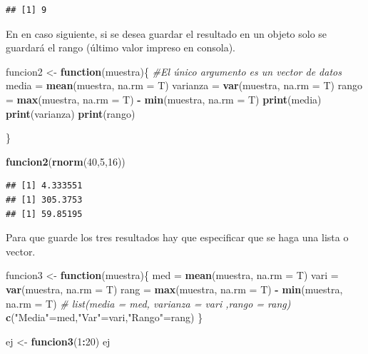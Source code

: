 \documentclass[]{book}
\newenvironment{Shaded}{\begin{snugshade}}{\end{snugshade}}
\newcommand{\KeywordTok}[1]{\textcolor[rgb]{0.13,0.29,0.53}{\textbf{#1}}}
\newcommand{\DataTypeTok}[1]{\textcolor[rgb]{0.13,0.29,0.53}{#1}}
\newcommand{\DecValTok}[1]{\textcolor[rgb]{0.00,0.00,0.81}{#1}}
\newcommand{\StringTok}[1]{\textcolor[rgb]{0.31,0.60,0.02}{#1}}
\newcommand{\CommentTok}[1]{\textcolor[rgb]{0.56,0.35,0.01}{\textit{#1}}}
\newcommand{\ControlFlowTok}[1]{\textcolor[rgb]{0.13,0.29,0.53}{\textbf{#1}}}
\newcommand{\OperatorTok}[1]{\textcolor[rgb]{0.81,0.36,0.00}{\textbf{#1}}}
\newcommand{\NormalTok}[1]{#1}
\begin{document}
\begin{verbatim}
## [1] 9
\end{verbatim}

En en caso siguiente, si se desea guardar el resultado en un objeto solo
se guardará el rango (último valor impreso en consola).

\begin{Shaded}
\begin{Highlighting}[]
\NormalTok{funcion2 <-}\StringTok{ }\ControlFlowTok{function}\NormalTok{(muestra)\{     }\CommentTok{#El único argumento es un vector de datos}
\NormalTok{  media =}\StringTok{ }\KeywordTok{mean}\NormalTok{(muestra, }\DataTypeTok{na.rm =}\NormalTok{ T)}
\NormalTok{  varianza =}\StringTok{ }\KeywordTok{var}\NormalTok{(muestra, }\DataTypeTok{na.rm =}\NormalTok{ T)}
\NormalTok{  rango =}\StringTok{ }\KeywordTok{max}\NormalTok{(muestra, }\DataTypeTok{na.rm =}\NormalTok{ T) }\OperatorTok{-}\StringTok{ }\KeywordTok{min}\NormalTok{(muestra, }\DataTypeTok{na.rm =}\NormalTok{ T)}
  \KeywordTok{print}\NormalTok{(media)}
  \KeywordTok{print}\NormalTok{(varianza)}
  \KeywordTok{print}\NormalTok{(rango)}

\NormalTok{\}}

\KeywordTok{funcion2}\NormalTok{(}\KeywordTok{rnorm}\NormalTok{(}\DecValTok{40}\NormalTok{,}\DecValTok{5}\NormalTok{,}\DecValTok{16}\NormalTok{))}
\end{Highlighting}
\end{Shaded}

\begin{verbatim}
## [1] 4.333551
## [1] 305.3753
## [1] 59.85195
\end{verbatim}

Para que guarde los tres resultados hay que especificar que se haga una
lista o vector.

\begin{Shaded}
\begin{Highlighting}[]
\NormalTok{funcion3 <-}\StringTok{ }\ControlFlowTok{function}\NormalTok{(muestra)\{     }
\NormalTok{  med =}\StringTok{ }\KeywordTok{mean}\NormalTok{(muestra, }\DataTypeTok{na.rm =}\NormalTok{ T)}
\NormalTok{  vari =}\StringTok{ }\KeywordTok{var}\NormalTok{(muestra, }\DataTypeTok{na.rm =}\NormalTok{ T)}
\NormalTok{  rang =}\StringTok{ }\KeywordTok{max}\NormalTok{(muestra, }\DataTypeTok{na.rm =}\NormalTok{ T) }\OperatorTok{-}\StringTok{ }\KeywordTok{min}\NormalTok{(muestra, }\DataTypeTok{na.rm =}\NormalTok{ T)}
  \CommentTok{# list(media = med, varianza = vari ,rango = rang)}
  \KeywordTok{c}\NormalTok{(}\StringTok{"Media"}\NormalTok{=med,}\StringTok{"Var"}\NormalTok{=vari,}\StringTok{"Rango"}\NormalTok{=rang)}
\NormalTok{\}}

\NormalTok{ej <-}\StringTok{ }\KeywordTok{funcion3}\NormalTok{(}\DecValTok{1}\OperatorTok{:}\DecValTok{20}\NormalTok{)}
\NormalTok{ej}
\end{Highlighting}
\end{Shaded}
\end{document}
